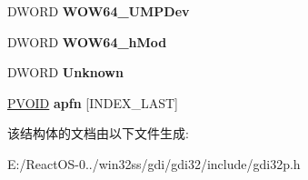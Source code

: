 \begin{DoxyCompactItemize}
\mbox{\label{struct___u_m_p_d_e_v_a7ceae578706186fe274f7b22326299e2}} 
D\+W\+O\+RD {\bfseries W\+O\+W64\+\_\+\+U\+M\+P\+Dev}
\item 
\mbox{\label{struct___u_m_p_d_e_v_a270eed349545f289712a56b62ee48bb1}} 
D\+W\+O\+RD {\bfseries W\+O\+W64\+\_\+h\+Mod}
\item 
\mbox{\label{struct___u_m_p_d_e_v_adb77f4303792a27ec643dcffb80a4665}} 
D\+W\+O\+RD {\bfseries Unknown}
\item 
\mbox{\label{struct___u_m_p_d_e_v_a4a04679eeb5228481287f8f2baeb0eb4}} 
\hyperlink{interfacevoid}{P\+V\+O\+ID} {\bfseries apfn} \mbox{[}I\+N\+D\+E\+X\+\_\+\+L\+A\+ST\mbox{]}
\end{DoxyCompactItemize}


该结构体的文档由以下文件生成\+:\begin{DoxyCompactItemize}
\item 
E\+:/\+React\+O\+S-\/0../win32ss/gdi/gdi32/include/gdi32p.\+h\end{DoxyCompactItemize}
